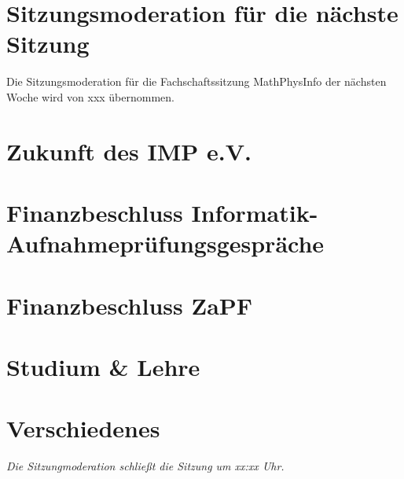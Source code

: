 \documentclass[11pt, fachschaft=mathphys,twosided=true]{mathphys/mathphys-article}
\begin{document}
\section{Sitzungsmoderation für die nächste Sitzung}
    Die Sitzungsmoderation für die Fachschaftssitzung MathPhysInfo der nächsten Woche wird von xxx übernommen. %

\section{Zukunft des IMP e.V.}

\section{Finanzbeschluss Informatik-Aufnahmeprüfungsgespräche}

\section{Finanzbeschluss ZaPF}

\section{Studium \& Lehre}

\section{Verschiedenes}


                \emph{Die Sitzungmoderation schließt die Sitzung um xx:xx Uhr.}
                
\end{document}
